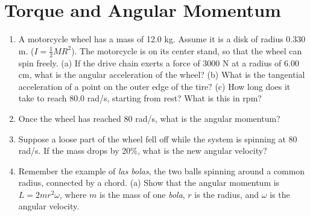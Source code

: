 \documentclass{article}
\begin{document}
\section{Torque and Angular Momentum}

\begin{enumerate}
\item A motorcycle wheel has a mass of 12.0 kg. Assume it is a disk of radius 0.330 m. ($I = \frac{1}{2} M R^2$).  The motorcycle is on its center stand, so that the wheel can spin freely. (a) If the drive chain exerts a force of 3000 N at a radius of 6.00 cm, what is the angular acceleration of the wheel? (b) What is the tangential acceleration of a point on the outer edge of the tire? (c) How long does it take to reach 80.0 rad/s, starting from rest? What is this in rpm? \\ \vspace{3cm}
\item Once the wheel has reached 80 rad/s, what is the angular momentum? \\ \vspace{2cm}
\item Suppose a loose part of the wheel fell off while the system is spinning at 80 rad/s.  If the mass drops by 20\%, what is the new angular velocity? \\ \vspace{2cm}
\item Remember the example of \textit{las bolas}, the two balls spinning around a common radius, connected by a chord.  (a) Show that the angular momentum is $L = 2 mr^2 \omega$, where $m$ is the mass of one \textit{bola}, $r$ is the radius, and $\omega$ is the angular velocity.
\end{enumerate}
\end{document}
